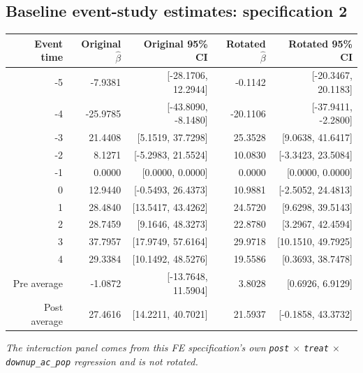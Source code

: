 \documentclass[10pt]{article}
\begin{document}
\subsection*{Baseline event-study estimates: specification 2}
\begin{center}
\scriptsize
\begin{tabular}{r rr rr}
\toprule
Event time & Original $\hat\beta$ & Original 95\% CI & Rotated $\hat\beta$ & Rotated 95\% CI \\
\midrule
-5 & -7.9381 & [-28.1706, 12.2944] & -0.1142 & [-20.3467, 20.1183] \\
-4 & -25.9785 & [-43.8090, -8.1480] & -20.1106 & [-37.9411, -2.2800] \\
-3 & 21.4408 & [5.1519, 37.7298] & 25.3528 & [9.0638, 41.6417] \\
-2 & 8.1271 & [-5.2983, 21.5524] & 10.0830 & [-3.3423, 23.5084] \\
-1 & 0.0000 & [0.0000, 0.0000] & 0.0000 & [0.0000, 0.0000] \\
0 & 12.9440 & [-0.5493, 26.4373] & 10.9881 & [-2.5052, 24.4813] \\
1 & 28.4840 & [13.5417, 43.4262] & 24.5720 & [9.6298, 39.5143] \\
2 & 28.7459 & [9.1646, 48.3273] & 22.8780 & [3.2967, 42.4594] \\
3 & 37.7957 & [17.9749, 57.6164] & 29.9718 & [10.1510, 49.7925] \\
4 & 29.3384 & [10.1492, 48.5276] & 19.5586 & [0.3693, 38.7478] \\
\midrule
Pre average & -1.0872 & [-13.7648, 11.5904] & 3.8028 & [0.6926, 6.9129] \\
Post average & 27.4616 & [14.2211, 40.7021] & 21.5937 & [-0.1858, 43.3732] \\
\bottomrule
\end{tabular}
\end{center}
\medskip
\textit{The interaction panel comes from this FE specification's own \texttt{post} $\times$ \texttt{treat} $\times$ \texttt{downup\_ac\_pop} regression and is not rotated.}
\clearpage
\end{document}
